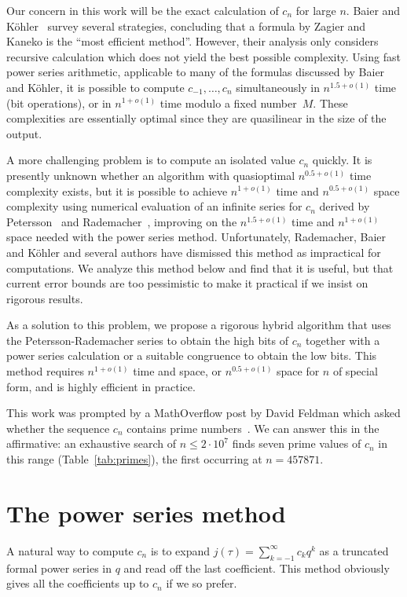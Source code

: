 \documentclass{amsart}
\theoremstyle{definition}
\theoremstyle{remark}
\begin{document}
Our concern in this work will be the exact calculation
of $c_n$ for large $n$.
Baier and K\"{o}hler~\cite{Baier2003} survey several strategies,
concluding that a formula by Zagier and Kaneko
is the ``most efficient method''.
However, their analysis only considers
recursive calculation which does not yield the best
possible complexity. Using fast power series
arithmetic, applicable to many of the formulas
discussed by Baier and K\"{o}hler, it is possible to compute
$c_{-1},\ldots,c_n$ simultaneously in $n^{1.5+o(1)}$ time (bit operations),
or in $n^{1+o(1)}$ time modulo a fixed number~$M$.
These complexities are essentially optimal
since they are quasilinear in the size of the output.

A more challenging problem is to compute an isolated
value $c_n$ quickly.
It is presently unknown whether an algorithm with
quasioptimal
$n^{0.5+o(1)}$ time complexity exists,
but it is possible to achieve 
$n^{1+o(1)}$ time and $n^{0.5+o(1)}$ space complexity
using numerical evaluation of an infinite series for $c_n$ derived
by Petersson~\cite{petersson1932} and Rademacher~\cite{Rademacher1938},
improving on the
$n^{1.5+o(1)}$ time and $n^{1+o(1)}$ space
needed with the power series method.
Unfortunately, Rademacher, Baier and K\"{o}hler
and several authors have dismissed this method
as impractical for computations.
We analyze this method below and find that it is useful,
but that current error bounds are too pessimistic to make it practical
if we insist on rigorous results.

As a solution to this problem, we propose a rigorous hybrid algorithm
that uses the Petersson-Rademacher series
to obtain the high bits of $c_n$ together with a
power series calculation or a suitable congruence
to obtain the low bits.
This method requires $n^{1+o(1)}$ time and space,
or $n^{0.5+o(1)}$ space for $n$ of special form,
and is highly efficient in practice.

This work was prompted by a MathOverflow post by David Feldman
which asked whether the sequence $c_n$ contains prime numbers~\cite{MO2}.
We can answer this in the affirmative: an
exhaustive search of $n \le 2 \cdot 10^7$
finds seven prime values of $c_n$ in this range (Table~\ref{tab:primes}), the first
occurring at $n = 457871$.

\section{The power series method}

A natural way to compute $c_n$ is to
expand $j(\tau) = \sum_{k=-1}^{\infty} c_k q^k$ as a truncated formal power series
in $q$ and read off the last coefficient.
This method obviously gives all the coefficients up to $c_n$ if
we so prefer.
\end{document}
